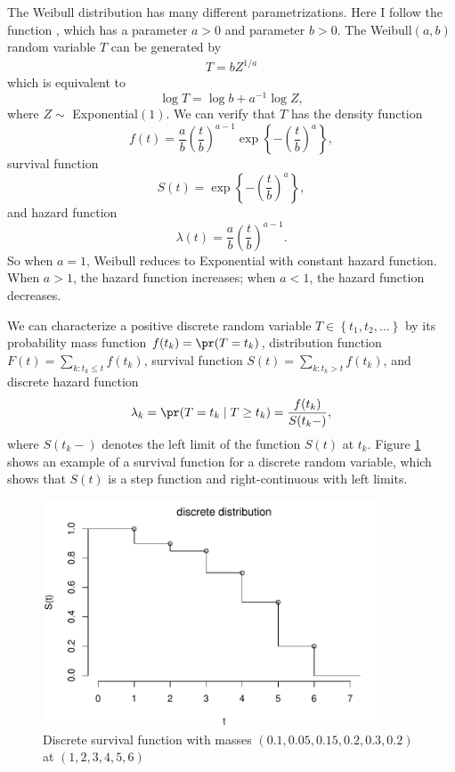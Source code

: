 \begin{example}
[Weibull]
The Weibull distribution has many different parametrizations. Here I follow the  function , which has a  parameter $a>0$ and  parameter $b>0$. The Weibull$(a,b)$ random variable $T$ can be generated by
\begin{eqnarray}
\label{eq::weibull-representation}
T = b Z^{1/a}
\end{eqnarray}
which is equivalent to
\[
\log T = \log b + a^{-1} \log Z,
\]
where $Z\sim $ Exponential$(1)$. We can verify that  $T$ has the density function
\[
f(t)=  \frac{a}{b} \left(  \frac{t}{b}   \right)^{a-1} \exp\left\{  - \left(  \frac{t}{b}   \right)^a \right\},
\]
survival function
$$
S(t)  = \exp\left\{  - \left(  \frac{t}{b}   \right)^a \right\},
$$
and hazard function
$$
\lambda(t) = \frac{a}{b} \left(  \frac{t}{b}   \right)^{a-1}.
$$
So when $a=1$, Weibull reduces to Exponential with constant hazard function. When $a>1$, the hazard function increases; when $a<1$, the hazard function decreases. 
\end{example}
 



We can characterize a positive discrete  random variable $T\in\left\{ t_{1},t_{2},\ldots\right\} $
by its probability mass function $f(t_{k})=\pr(T=t_{k})$, distribution
function $F(t)=\sum_{k:t_{k}\leq t}f(t_{k})$, survival function $S(t)=\sum_{k:t_{k}>t}f(t_{k})$,
and discrete hazard function
\[
\lambda_{k}=\pr(T=t_{k}\mid T\geq t_{k})=\frac{f(t_{k})}{S(t_{k}-)},
\]
where $S(t_{k}-)$ denotes the left limit of the function $S(t)$
at $t_{k}$. Figure \ref{fig::discrete-survival-fn} shows an example of a survival function for a discrete random variable, which shows that $S(t)$ is a step function and right-continuous with left limits. 


\begin{figure}
\centering
\includegraphics[width=0.9\textwidth]{figures/discrete_survival_fn.pdf}
\caption{Discrete survival function with masses $(0.1, 0.05, 0.15, 0.2, 0.3, 0.2)$ at $(1,2,3,4,5,6)$}
\label{fig::discrete-survival-fn}
\end{figure}
 


